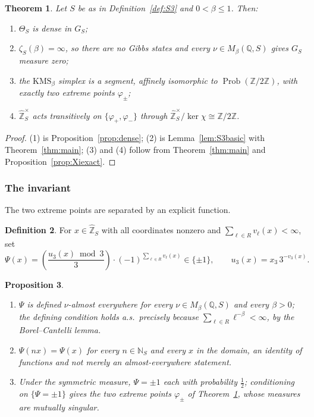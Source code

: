 \documentclass[11pt]{amsart}
\numberwithin{equation}{section}
\newtheorem{theorem}{Theorem}[section]
\newtheorem{proposition}[theorem]{Proposition}
\theoremstyle{definition}
\newtheorem{definition}[theorem]{Definition}
\theoremstyle{remark}
\newcommand{\Z}{\mathbb{Z}}
\newcommand{\Q}{\mathbb{Q}}
\newcommand{\N}{\mathbb{N}}
\newcommand{\hZ}{\widehat{\Z}}
\newcommand{\Prob}{\operatorname{Prob}}
\newcommand{\Leg}[2]{\left(\frac{#1}{#2}\right)}
\begin{document}
\begin{theorem}\label{thm:dens}
Let $S$ be as in Definition~\ref{def:S3} and $0<\beta\le1$. Then:
\begin{enumerate}
\item $\Theta_S$ is dense in $G_S$;
\item $\zeta_S(\beta)=\infty$, so there are no Gibbs states and every
$\nu\in M_\beta(\Q,S)$ gives $G_S$ measure zero;
\item the $\mathrm{KMS}_\beta$ simplex is a segment, affinely isomorphic to
$\Prob(\Z/2\Z)$, with exactly two extreme points $\varphi_\pm$;
\item $\hZ_S^\times$ acts transitively on $\{\varphi_+,\varphi_-\}$ through
$\hZ_S^\times/\ker\chi\cong\Z/2\Z$.
\end{enumerate}
\end{theorem}

\begin{proof}
(1) is Proposition~\ref{prop:dense}; (2) is Lemma~\ref{lem:S3basic} with
Theorem~\ref{thm:main}; (3) and (4) follow from Theorem~\ref{thm:main} and
Proposition~\ref{prop:Xiexact}.
\end{proof}

\subsubsection*{The invariant}

The two extreme points are separated by an explicit function.

\begin{definition}\label{def:Psi}
For $x\in\hZ_S$ with all coordinates nonzero and $\sum_{\ell\in R}v_\ell(x)<\infty$,
set
\begin{equation}\label{eq:Psi}
\Psi(x)=\Leg{u_3(x)\bmod3}{3}\cdot(-1)^{\sum_{\ell\in R}v_\ell(x)}\in\{\pm1\},
\qquad u_3(x)=x_3\,3^{-v_3(x)} .
\end{equation}
\end{definition}

\begin{proposition}\label{prop:Psi}
\begin{enumerate}
\item $\Psi$ is defined $\nu$-almost everywhere for every $\nu\in M_\beta(\Q,S)$
and every $\beta>0$; the defining condition holds a.s.\ precisely because
$\sum_{\ell\in R}\ell^{-\beta}<\infty$, by the Borel--Cantelli lemma.
\item $\Psi(nx)=\Psi(x)$ for every $n\in\N_S$ and every $x$ in the domain, an
identity of functions and not merely an almost-everywhere statement.
\item Under the symmetric measure, $\Psi=\pm1$ each with probability $\tfrac12$;
conditioning on $\{\Psi=\pm1\}$ gives the two extreme points $\varphi_\pm$ of
Theorem~\ref{thm:dens}, whose measures are mutually singular.
\end{enumerate}
\end{proposition}
\end{document}
